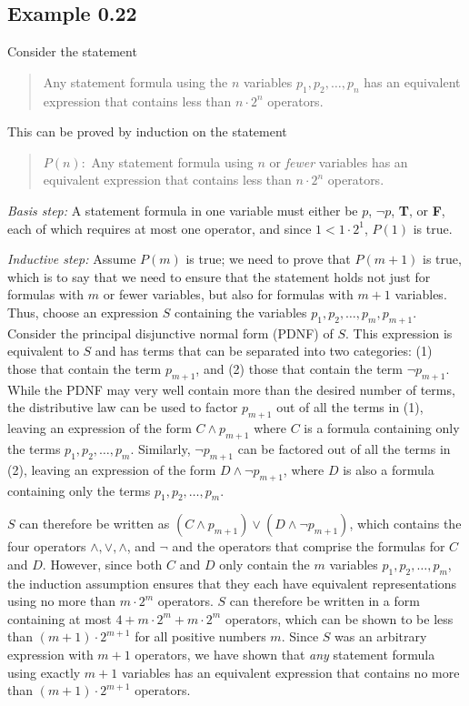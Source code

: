 \subsection*{Example 0.22}

Consider the statement
\begin{quote}
Any statement formula using the $n$ variables $p_1, p_2, \ldots , p_n$ has an
equivalent expression that contains less than $n \cdot 2^n$ operators.
\end{quote}
This can be proved by induction on the statement
\begin{quote}
$P(n):$ Any statement formula using $n$ or \emph{fewer} variables has an
equivalent expression that contains less than $n \cdot 2^n$ operators.
\end{quote}

\emph{Basis step:} A statement formula in one variable must either be
$p$, $\neg p$, \textbf{T}, or \textbf{F}, each of which requires at most one
operator, and since $1<1\cdot 2^1$, $P(1)$ is true.

\emph{Inductive step:} Assume $P(m)$ is true; we need to prove that $P(m + 1)$
is true, which is to say that we need to ensure that the statement holds not
just for formulas with $m$ or fewer variables, but also for formulas with $m+1$
variables. Thus, choose an expression $S$ containing the variables
$p_1, p_2, \ldots ,p_m, p_{m+1}$. Consider the principal disjunctive normal form
(PDNF) of $S$. This expression is equivalent to $S$ and has terms that can be
separated into two categories: (1) those that contain the term $p_{m+1}$, and
(2) those that contain the term $\neg p_{m+1}$. While the PDNF may very well
contain more than the desired number of terms, the distributive law can be used
to factor $p_{m+1}$ out of all the terms in (1), leaving an expression of the
form $C \wedge p_{m+1}$ where $C$ is a formula containing only the terms
$p_1, p_2, \ldots, p_m$. Similarly, $\neg p_{m+1}$ can be factored out of all
the terms in (2), leaving an expression of the form $D \wedge \neg p_{m+1}$,
where $D$ is also a formula containing only the terms $p_1, p_2, \ldots, p_m$.

$S$ can therefore be written as $(C \wedge p_{m+1})\vee(D \wedge \neg p_{m+1})$,
which contains the four operators $\wedge, \vee, \wedge$, and $\neg$ and the
operators that comprise the formulas for $C$ and $D$. However, since both $C$ and $D$
only contain the $m$ variables $p_1, p_2, \ldots, p_m$, the induction assumption
ensures that they each have equivalent representations using no more than
$m \cdot 2^m$ operators. $S$ can therefore be written in a form containing at
most $4 + m \cdot 2^m + m \cdot 2^m$ operators, which can be shown to be less
than $(m + 1)\cdot 2^{m+1}$ for all positive numbers $m$. Since $S$ was an
arbitrary expression with $m + 1$ operators, we have shown that \emph{any} statement
formula using exactly $m + 1$ variables has an equivalent expression that
contains no more than $(m + 1) \cdot 2^{m + 1}$ operators.


